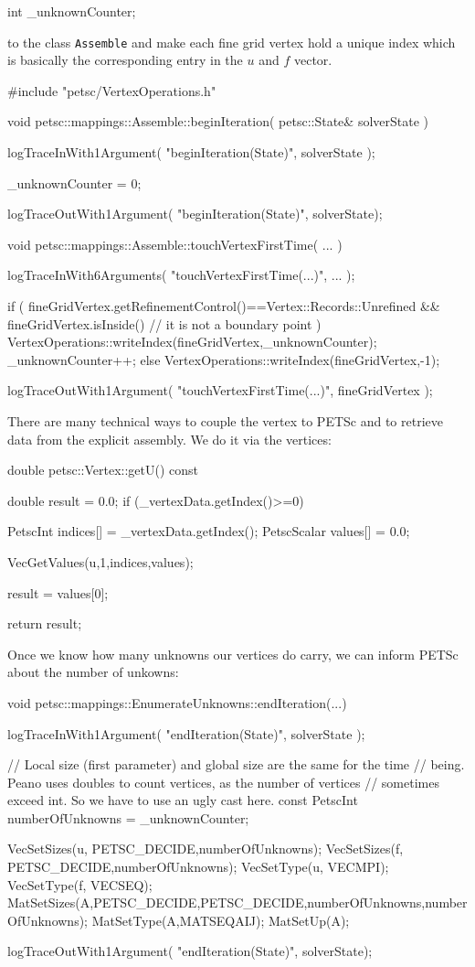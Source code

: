 \begin{code}
int  _unknownCounter;
\end{code}

\noindent
to the class \texttt{Assemble} and make each fine grid vertex hold a unique
index which is basically the corresponding entry in the $u$ and $f$ vector.

\begin{code}
#include "petsc/VertexOperations.h"

void petsc::mappings::Assemble::beginIteration(
  petsc::State&  solverState
) {
  logTraceInWith1Argument( "beginIteration(State)", solverState );

  _unknownCounter = 0;

  logTraceOutWith1Argument( "beginIteration(State)", solverState);
}

void petsc::mappings::Assemble::touchVertexFirstTime(
  ...
) {
  logTraceInWith6Arguments( "touchVertexFirstTime(...)", ... );

  if (
    fineGridVertex.getRefinementControl()==Vertex::Records::Unrefined
    &&
    fineGridVertex.isInside() // it is not a boundary point
  ) {
    VertexOperations::writeIndex(fineGridVertex,_unknownCounter);
    _unknownCounter++;
  }
  else {
    VertexOperations::writeIndex(fineGridVertex,-1);
  }

  logTraceOutWith1Argument( "touchVertexFirstTime(...)", fineGridVertex );
}
\end{code}

\noindent
There are many technical ways to couple the vertex to PETSc and to retrieve
data from the explicit assembly.
We do it via the vertices:

\begin{code}
double petsc::Vertex::getU() const {
  double result = 0.0;
  if (_vertexData.getIndex()>=0) {
    PetscInt     indices[] = {_vertexData.getIndex()};
    PetscScalar  values[]  = {0.0};

    VecGetValues(u,1,indices,values);

    result = values[0];
  }
  return result;
}
\end{code}


\noindent
Once we know how many unknowns our vertices do carry, we can inform PETSc about
the number of unkowns:

\begin{code}
void petsc::mappings::EnumerateUnknowns::endIteration(...) {
  logTraceInWith1Argument( "endIteration(State)", solverState );

  // Local size (first parameter) and global size are the same for the time
  // being. Peano uses doubles to count vertices, as the number of vertices
  // sometimes exceed int. So we have to use an ugly cast here.
  const PetscInt numberOfUnknowns = _unknownCounter;

  VecSetSizes(u, PETSC_DECIDE,numberOfUnknowns);
  VecSetSizes(f, PETSC_DECIDE,numberOfUnknowns);
  VecSetType(u, VECMPI);
  VecSetType(f, VECSEQ);
  MatSetSizes(A,PETSC_DECIDE,PETSC_DECIDE,numberOfUnknowns,numberOfUnknowns);
  MatSetType(A,MATSEQAIJ);
  MatSetUp(A);

  logTraceOutWith1Argument( "endIteration(State)", solverState);
}
\end{code}


